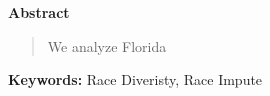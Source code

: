 %
\begin{center}
{\bf Abstract}
\end{center}
%
\par
\begin{footnotesize}
  \begin{quote}
We analyze Florida
    \\[2ex] 
  \end{quote}
\end{footnotesize}
%
\textbf{Keywords:} Race Diveristy, Race Impute \newpage
